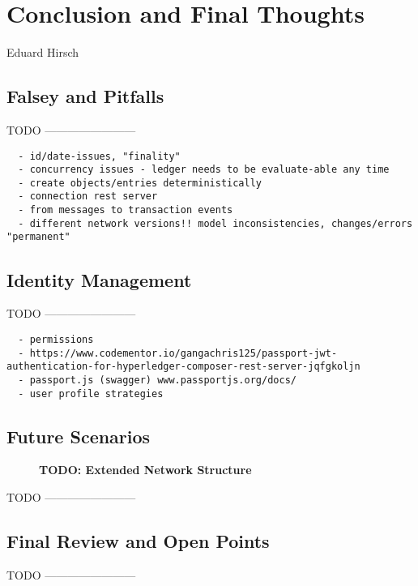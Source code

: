 \chapter{Conclusion and Final Thoughts}
\label{ch:conclusion}

\vspace{-1cm}
\begin{center}
Eduard Hirsch
\end{center}

\section{Falsey and Pitfalls}

TODO ------------------------

\begin{verbatim}
  - id/date-issues, "finality"
  - concurrency issues - ledger needs to be evaluate-able any time
  - create objects/entries deterministically
  - connection rest server
  - from messages to transaction events
  - different network versions!! model inconsistencies, changes/errors "permanent"
\end{verbatim}

\section{Identity Management}
\label{sec:id-management}

TODO ------------------------

\begin{verbatim}
  - permissions
  - https://www.codementor.io/gangachris125/passport-jwt-authentication-for-hyperledger-composer-rest-server-jqfgkoljn
  - passport.js (swagger) www.passportjs.org/docs/
  - user profile strategies
\end{verbatim}

\section{Future Scenarios}
\label{sec:future-scene}

\begin{figure}[htbp]
  \centering
  \caption{\bf\small TODO: Extended Network Structure}
  \label{fig:prototype-net-ext}
\end{figure}

TODO ------------------------

\section{Final Review and Open Points}

TODO ------------------------